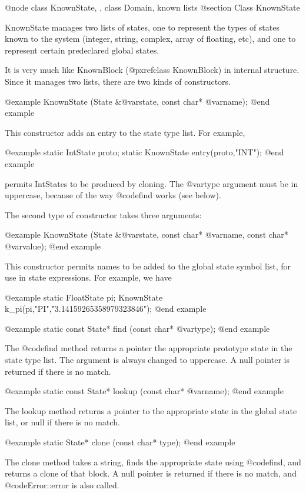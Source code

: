 @node class KnownState,  , class Domain, known lists
@section Class KnownState

KnownState manages two lists of states, one to represent the types of
states known to the system (integer, string, complex, array of floating,
etc), and one to represent certain predeclared global states.

It is very much like KnownBlock (@pxref{class KnownBlock})
in internal structure.  Since it manages
two lists, there are two kinds of constructors.

@example
KnownState (State &@var{state}, const char* @var{name});
@end example

This constructor adds an entry to the state type list.  For example,

@example
static IntState proto;
static KnownState entry(proto,"INT");
@end example

permits IntStates to be produced by cloning.  The @var{type} argument
must be in uppercase, because of the way @code{find} works (see below).

The second type of constructor takes three arguments:

@example
KnownState (State &@var{state}, const char* @var{name}, const char* @var{value});
@end example

This constructor permits names to be added to the global state symbol
list, for use in state expressions.  For example, we have

@example
static FloatState pi;
KnownState k_pi(pi,"PI","3.14159265358979323846");
@end example

@example
static const State* find (const char* @var{type});
@end example

The @code{find} method returns a pointer the appropriate prototype
state in the state type list.  The argument is always changed to
uppercase.  A null pointer is returned if there is no match.

@example
static const State* lookup (const char* @var{name});
@end example

The lookup method returns a pointer to the appropriate state in
the global state list, or null if there is no match.

@example
static State* clone (const char* type);
@end example

The clone method takes a string, finds the appropriate state using
@code{find}, and returns a clone of that block.  A null pointer is
returned if there is no match, and @code{Error::error} is also called.

